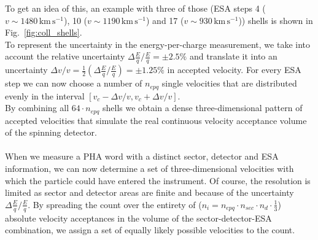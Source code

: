 To get an idea of this, an example with three of those (ESA steps 4 ($v \sim 1480 \,\mathrm{km\,s^{-1}}$), 10 ($v \sim 1190 \,\mathrm{km\,s^{-1}}$) and 17 ($v \sim 930 \,\mathrm{km\,s^{-1}}$)) shells is shown in Fig.~\ref{fig:coll_shells}.\\
To represent the uncertainty in the energy-per-charge measurement, we take into account the relative uncertainty $\Delta \frac{E}{q}/\frac{E}{q} = \pm 2.5\%$ \citep{gloeckler_1992} and translate it into an uncertainty $\Delta v / v = \frac{1}{2} \left( \Delta \frac{E}{q}/\frac{E}{q}\right) = \pm 1.25\%$ in accepted velocity. For every ESA step we can now choose a number of $n_{epq}$ single velocities that are distributed evenly in the interval $\left[ v_c - \Delta v / v, v_c + \Delta v / v \right]$. %
\\
By combining all $64 \cdot n_{epq}$ shells we obtain a dense three-dimensional pattern of accepted velocities that simulate the real continuous velocity acceptance volume of the spinning detector.
\\ \\
When we measure a PHA word with a distinct sector, detector and ESA information, we can now determine a set of three-dimensional velocities with which the particle could have entered the instrument. Of course, the resolution is limited as sector and detector areas are finite and because of the uncertainty $\Delta \frac{E}{q}/\frac{E}{q}$. By spreading the count over the entirety of ($n_i = n_{epq}\cdot n_{sec} \cdot n_{d} \cdot \frac{1}{3}$) absolute velocity acceptances in the volume of the sector-detector-ESA combination, we assign a set of equally likely possible velocities to the count.
%
%
%
